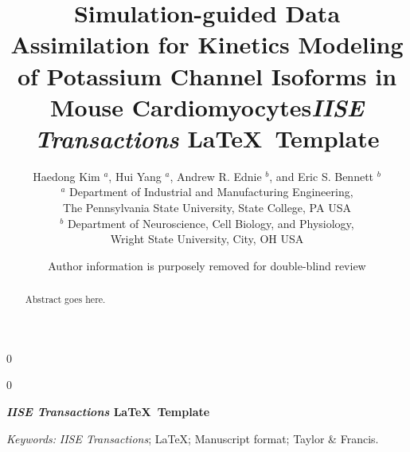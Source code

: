 \documentclass[11pt]{article}
\newcommand{\blind}{0}
\begin{document}
	
	\def\spacingset#1{\renewcommand{\baselinestretch}%
		{#1}\small\normalsize} \spacingset{1}
	
	\blind
	{
		\title{\bf Simulation-guided Data Assimilation for Kinetics Modeling of Potassium Channel Isoforms in Mouse Cardiomyocytes}
		\author{Haedong Kim $^a$, Hui Yang $^a$, Andrew R. Ednie $^b$, and Eric S. Bennett $^b$ \\
		$^a$ Department of Industrial and Manufacturing Engineering, \\
		The Pennsylvania State University, State College, PA USA \\
        $^b$ Department of Neuroscience, Cell Biology, and Physiology, \\
        Wright State University, City, OH USA}
		\date{}
		\maketitle
	} \fi
	
	\blind
	{
        \title{\bf \emph{IISE Transactions} \LaTeX \ Template}
		\author{Author information is purposely removed for double-blind review}
		
\bigskip
		\bigskip
		\bigskip
		\begin{center}
			{\LARGE\bf \emph{IISE Transactions} \LaTeX \ Template}
		\end{center}
		\medskip
	} \fi
	\bigskip
		
\begin{abstract}
Abstract goes here.
\end{abstract}
		
\noindent%
{\it Keywords:} \emph{IISE Transactions}; \LaTeX; Manuscript format; Taylor \& Francis.

\spacingset{1.5} %
\end{document}
